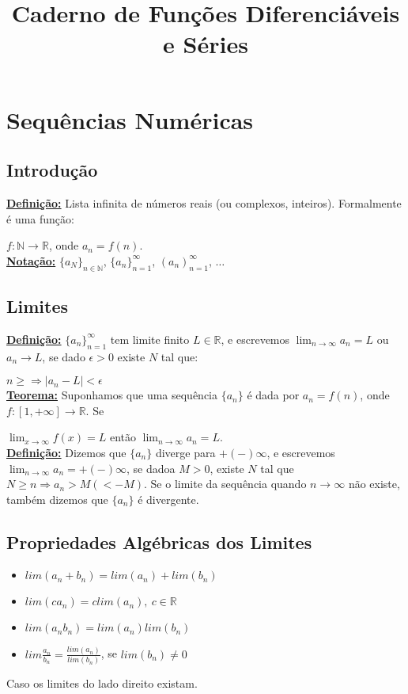 \documentclass[12pt]{book}
\title{Caderno de Funções Diferenciáveis e Séries}
\author{}
\date{}
\newcommand{\real}{\mathbb{R}}
\newcommand{\mytitle}[1]{\textbf{\underline{#1}}}
\begin{document}
\maketitle
\tableofcontents

\chapter{Sequências Numéricas}
\section{Introdução}

\mytitle{Definição:} Lista infinita de números reais (ou complexos, inteiros). Formalmente é uma função:

$f:\mathbb{N} \rightarrow \real$, onde $a_n=f(n)$.\\
\mytitle{Notação:} $\{a_N\}_{n\in\mathbb{N}}$, $\{a_n\}^\infty_{n=1}$, $(a_n)^\infty_{n=1}$, $\dots$\\

\section{Limites}

\mytitle{Definição:} $\{a_n\}^\infty_{n=1}$ tem limite finito $L \in \real$, e escrevemos $\lim_{n \to \infty}a_n=L$ ou $a_n\rightarrow L$, se dado $\epsilon >0$ existe $N$ tal que:

$n\geq \Rightarrow |a_n-L|<\epsilon$\\
\mytitle{Teorema:} Suponhamos que uma sequência $\{a_n\}$ é dada por $a_n=f(n)$, onde $f:[1,+\infty]\rightarrow \real$. Se

$\lim_{x \to \infty}f(x)=L$ então $\lim_{n \to \infty}a_n=L$.\\
\mytitle{Definição:} Dizemos que $\{a_n\}$ diverge para $+(-)\infty$, e escrevemos $\lim_{n \to \infty}a_n=+(-)\infty$, se dadoa $M>0$, existe $N$ tal que $N\geq n \Rightarrow a_n>M(<-M)$. Se o limite da sequência quando $n \to \infty$ não existe, também dizemos que $\{a_n\}$ é divergente.\\

\section{Propriedades Algébricas dos Limites}
\begin{itemize}
\item $lim(a_n+b_n)=lim(a_n)+lim(b_n)$
\item $lim(ca_n)=clim(a_n),\: c \in \real$
\item $lim(a_nb_n)=lim(a_n)lim(b_n)$
\item $lim\frac{a_n}{b_n}=\frac{lim(a_n)}{lim(b_n)}$, se $lim(b_n)\neq 0$
\end{itemize}
Caso os limites do lado direito existam.\\
\end{document}
